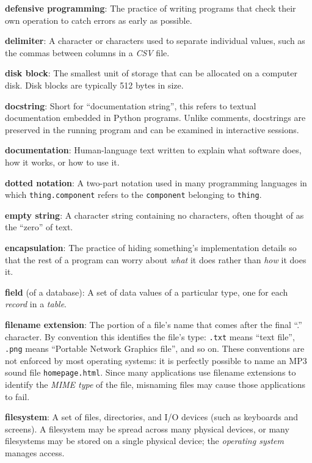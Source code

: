 \documentclass[]{book}
\newcommand{\gdef}[2]{\emph{#2}}
\begin{document}
\textbf{defensive programming}: The practice of writing programs that
check their own operation to catch errors as early as possible.

\textbf{delimiter}: A character or characters used to separate
individual values, such as the commas between columns in a
\gdef{g:csv}{CSV} file.

\textbf{disk block}: The smallest unit of storage that can be allocated
on a computer disk. Disk blocks are typically 512 bytes in size.

\textbf{docstring}: Short for ``documentation string'', this refers to
textual documentation embedded in Python programs. Unlike comments,
docstrings are preserved in the running program and can be examined in
interactive sessions.

\textbf{documentation}: Human-language text written to explain what
software does, how it works, or how to use it.

\textbf{dotted notation}: A two-part notation used in many programming
languages in which \texttt{thing.component} refers to the
\texttt{component} belonging to \texttt{thing}.

\textbf{empty string}: A character string containing no characters,
often thought of as the ``zero'' of text.

\textbf{encapsulation}: The practice of hiding something's
implementation details so that the rest of a program can worry about
\emph{what} it does rather than \emph{how} it does it.

\textbf{field} (of a database): A set of data values of a particular
type, one for each \gdef{g:record-database}{record} in a
\gdef{g:table-database}{table}.

\textbf{filename extension}: The portion of a file's name that comes
after the final ``.'' character. By convention this identifies the
file's type: \texttt{.txt} means ``text file'', \texttt{.png} means
``Portable Network Graphics file'', and so on. These conventions are not
enforced by most operating systems: it is perfectly possible to name an
MP3 sound file \texttt{homepage.html}. Since many applications use
filename extensions to identify the \gdef{g:mime-type}{MIME type} of
the file, misnaming files may cause those applications to fail.

\textbf{filesystem}: A set of files, directories, and I/O devices (such
as keyboards and screens). A filesystem may be spread across many
physical devices, or many filesystems may be stored on a single physical
device; the \gdef{g:operating-system}{operating system} manages
access.
\end{document}
